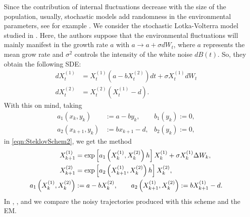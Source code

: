 	Since the contribution of internal fluctuations decrease with the size of the population, usually, stochastic
models add randomness in the environmental parameters, see for example 
\cite{Bahar2004, Mao2002, Mao2003, Mao2009, Takeuchi2006, Rudnicki2007, Liu2013d, Yagi2011}. 
We consider the stochastic Lotka-Volterra model studied in \citet{Arnold1979}. 
Here, the authors suppose that the environmental fluctuations will mainly manifest in the growth rate $a$ with
$a\to a+\sigma dW_t$, where $a$ represents the mean grow rate and $\sigma^2$ controls the intensity of the 
white noise $dB(t)$. So, they obtain the following SDE:
\begin{align}
	dX^{(1)}_t &= X^{(1)}_t(a -b X^{(2)}_t) dt +\sigma X^{(1)}_t dW_t
	\label{eqn:StoLotkaVolterraArnold1} \\
	dX^{(2)}_t &= X^{(2)}_t( X^{(1)}_t - d).
	\label{eqn:StoLotkaVolterraArnold2}
\end{align}
With this on mind, taking
\begin{align*}
	a_1(x_k, y_k) &:= a - b y_k, & b_1(y_k):= 0,\\
	a_2(x_{k+1}, y_k) &:= b x_{k+1} -d, & b_2(y_k):= 0,
\end{align*}
in \eqref{eqn:SteklovSchem2}, we get the \SM method
\begin{align}
	X^{(1)}_{k+1} &= \exp \left[ a_1 \left( X^{(1)}_k,X^{(2)}_k \right) h \right] X^{(1)}_k 
		+\sigma X^{(1)}_k \Delta 	W_k,  \notag \\
%
	X^{(2)}_{k+1} &= \exp \left[ a_2\left(X^{(1)}_{k+1},X^{(2)}_k\right) h \right] X^{(2)}_k, \\
		a_1\left( X^{(1)}_k, X^{(2)}_k \right) &:= a - b X^{(2)}_k, \qquad
		a_2\left( X^{(1)}_{k+1}, X^{(2)}_k \right):= b X^{(1)}_{k+1} -d. \notag
\end{align}
In 
	,
	, and
we compare the noisy trajectories produced with this scheme and the EM.


